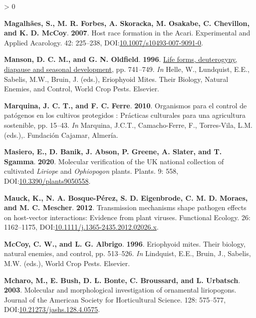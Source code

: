 \documentclass{ufdissertation}[overrideChapters] %
\newlength{\cslhangindent}
\newenvironment{CSLReferences}[2] %
 {%
  \setlength{\parindent}{0pt}
  \ifodd #1 \everypar{\setlength{\hangindent}{\cslhangindent}}\ignorespaces\fi
  \ifnum #2 > 0
  \setlength{\parskip}{#2\baselineskip}
  \fi
 }%
 {}
\begin{document}
{\begin{CSLReferences}{1}{1}
\leavevmode{}%
\textbf{Magalhães, S., M. R. Forbes, A. Skoracka, M. Osakabe, C. Chevillon, and K. D. McCoy}. \textbf{2007}. Host race formation in the {Acari}. Experimental and Applied Acarology. 42: 225--238, DOI:\href{https://doi.org/10.1007/s10493-007-9091-0}{10.1007/s10493-007-9091-0}.

\leavevmode{}%
\textbf{Manson, D. C. M., and G. N. Oldfield}. \textbf{1996}. \href{https://doi.org/10.1016/s1572-4379(96)80050-9}{Life forms, deuterogyny, diapause and seasonal development}, pp. 741--749. \emph{In} Helle, W., Lundquist, E.E., Sabelis, M.W., Bruin, J. (eds.), Eriophyoid Mites. Their Biology, Natural Enemies, and Control, World Crop Pests. Elsevier.

\leavevmode{}%
\textbf{Marquina, J. C. T., and F. C. Ferre}. \textbf{2010}. Organismos para el control de pat{ó}genos en los cultivos protegidos : Pr{á}cticas culturales para una agricultura sostenible, pp. 15--43. \emph{In} Marquina, J.C.T., Camacho-Ferre, F., Torres-Vila, L.M. (eds.),. Fundaci{ó}n Cajamar, Almer{í}a.

\leavevmode{}%
\textbf{Masiero, E., D. Banik, J. Abson, P. Greene, A. Slater, and T. Sgamma}. \textbf{2020}. Molecular verification of the {UK} national collection of cultivated {\emph{Liriope}} and {\emph{Ophiopogon}} plants. Plants. 9: 558, DOI:\href{https://doi.org/10.3390/plants9050558}{10.3390/plants9050558}.

\leavevmode{}%
\textbf{Mauck, K., N. A. Bosque-Pérez, S. D. Eigenbrode, C. M. D. Moraes, and M. C. Mescher}. \textbf{2012}. Transmission mechanisms shape pathogen effects on host-vector interactions: Evidence from plant viruses. Functional Ecology. 26: 1162--1175, DOI:\href{https://doi.org/10.1111/j.1365-2435.2012.02026.x}{10.1111/j.1365-2435.2012.02026.x}.

\leavevmode{}%
\textbf{McCoy, C. W., and L. G. Albrigo}. \textbf{1996}. Eriophyoid mites. Their biology, natural enemies, and control, pp. 513--526. \emph{In} Lindquist, E.E., Bruin, J., Sabelis, M.W. (eds.), World Crop Pests. Elsevier.

\leavevmode{}%
\textbf{Mcharo, M., E. Bush, D. L. Bonte, C. Broussard, and L. Urbatsch}. \textbf{2003}. Molecular and morphological investigation of ornamental liriopogons. Journal of the American Society for Horticultural Science. 128: 575--577, DOI:\href{https://doi.org/10.21273/jashs.128.4.0575}{10.21273/jashs.128.4.0575}.


\end{CSLReferences}}
\end{document}
